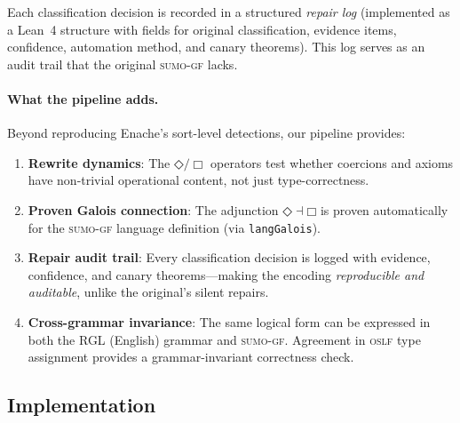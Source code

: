 \documentclass[11pt]{article}
\newcommand{\DiamondOp}{\mathbin{\Diamond}}
\newcommand{\BoxOp}{\mathbin{\Box}}
\newcommand{\SUMO}{\textsc{sumo}}
\newcommand{\GF}{\textsc{gf}}
\newcommand{\OSLF}{\textsc{oslf}}
\theoremstyle{definition}
\theoremstyle{plain}
\begin{document}
Each classification decision is recorded in a structured
\emph{repair log} (implemented as a Lean~4 structure with fields
for original classification, evidence items, confidence, automation
method, and canary theorems).  This log serves as an audit trail
that the original \SUMO{}-\GF{} lacks.

\paragraph{What the pipeline adds.}
Beyond reproducing Enache's sort-level detections, our pipeline
provides:
\begin{enumerate}[nosep]
  \item \textbf{Rewrite dynamics}: The $\DiamondOp/\BoxOp$ operators
    test whether coercions and axioms have non-trivial operational
    content, not just type-correctness.
  \item \textbf{Proven Galois connection}: The adjunction
    $\DiamondOp \dashv \BoxOp$ is proven automatically for the
    \SUMO{}-\GF{} language definition (via \texttt{langGalois}).
  \item \textbf{Repair audit trail}: Every classification decision
    is logged with evidence, confidence, and canary theorems---making
    the encoding \emph{reproducible and auditable}, unlike the
    original's silent repairs.
  \item \textbf{Cross-grammar invariance}: The same logical form
    can be expressed in both the RGL (English) grammar and
    \SUMO{}-\GF{}.  Agreement in \OSLF{} type assignment provides a
    grammar-invariant correctness check.
\end{enumerate}

\subsection{Implementation}
\end{document}
